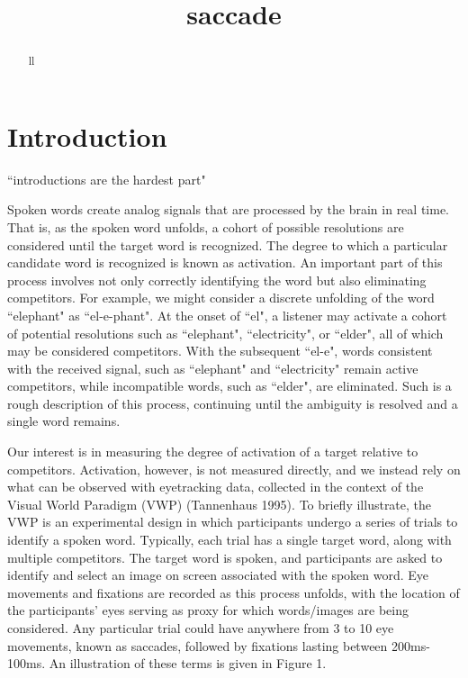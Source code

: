 \documentclass{article}
\title{saccade}
\date{}
\begin{document}

\maketitle

%

\begin{abstract}
ll
\end{abstract}

\section{Introduction}
``introductions are the hardest part"

Spoken words create analog signals that are processed by the brain in real time. That is, as the spoken word unfolds, a cohort of possible resolutions are considered until the target word is recognized. The degree to which a particular candidate word is recognized is known as activation. An important part of this process involves not only correctly identifying the word but also eliminating competitors. For example, we might consider a discrete unfolding of the word ``elephant" as ``el-e-phant". At the onset of ``el", a listener may activate a cohort of potential resolutions such as ``elephant", ``electricity", or ``elder", all of which may be considered competitors. With the subsequent ``el-e", words consistent with the received signal, such as ``elephant" and ``electricity" remain active competitors, while incompatible words, such as ``elder", are eliminated. Such is a rough description of this process, continuing until the ambiguity is resolved and a single word remains.

Our interest is in measuring the degree of activation of a target relative to competitors. Activation, however, is not measured directly, and we instead rely on what can be observed with eyetracking data, collected in the context of the Visual World Paradigm (VWP) (Tannenhaus 1995)\cite{tanenhaus1995integration}. To briefly illustrate, the VWP is an experimental design in which participants undergo a series of trials to identify a spoken word. Typically, each trial has a single target word, along with multiple competitors. The target word is spoken, and participants are asked to identify and select an image on screen associated with the spoken word. Eye movements and fixations are recorded as this process unfolds, with the location of the participants' eyes serving as proxy for which words/images are being considered. Any particular trial could have anywhere from 3 to 10 eye movements, known as saccades, followed by fixations lasting between 200ms-100ms. An illustration of these terms is given in Figure 1. 
\end{document}
